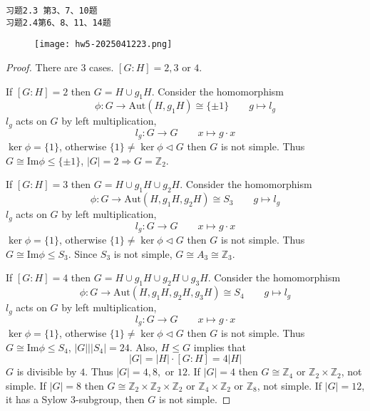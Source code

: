 \begin{lstlisting}
习题2.3 第3、7、10题
习题2.4第6、8、11、14题
\end{lstlisting}
\begin{figure}[H]
\centering
\texttt{[image: hw5-2025041223.png]}
\label{}
\end{figure}

\begin{proof}
There are 3 cases. $[G:H]=2,3$ or $4$.

If $[G:H]=2$ then $G=H\cup g_1H$. Consider the homomorphism
\[
\phi:G\to \mathrm{Aut}(H,g_1H)\cong \{ \pm1 \}\qquad g\mapsto l_{g}
\]
$l_{g}$ acts on $G$ by left multiplication,
\[
l_{g}:G\to G\qquad x\mapsto g\cdot x
\]
$\ker \phi =\{ 1 \}$, otherwise $\{ 1 \}\neq\ker \phi\lhd G$ then $G$ is not simple. Thus $G\cong\mathrm{Im}\phi\leq \{ \pm1 \}$, $\lvert G \rvert=2\Rightarrow G=\mathbb{Z}_{2}$.

If $[G:H]=3$ then $G=H\cup g_1H\cup g_2H$. Consider the homomorphism
\[
\phi:G\to \mathrm{Aut}(H,g_1H,g_2H)\cong S_3\qquad g\mapsto l_{g}
\]
$l_{g}$ acts on $G$ by left multiplication,
\[
l_{g}:G\to G\qquad x\mapsto g\cdot x
\]
$\ker \phi =\{ 1 \}$, otherwise $\{ 1 \}\neq\ker \phi\lhd G$ then $G$ is not simple. Thus $G\cong\mathrm{Im}\phi\leq S_3$. Since $S_3$ is not simple, $G\cong A_3\cong \mathbb{Z}_{3}$.

If $[G:H]=4$ then $G=H\cup g_1H\cup g_2H\cup g_3H$. Consider the homomorphism
\[
\phi:G\to \mathrm{Aut}(H,g_1H,g_2H,g_3H)\cong S_4\qquad g\mapsto l_{g}
\]
$l_{g}$ acts on $G$ by left multiplication,
\[
l_{g}:G\to G\qquad x\mapsto g\cdot x
\]
$\ker \phi =\{ 1 \}$, otherwise $\{ 1 \}\neq\ker \phi\lhd G$ then $G$ is not simple. Thus $G\cong\mathrm{Im}\phi\leq S_4$, $\lvert G \rvert|\lvert S_4 \rvert=24$. Also, $H\leq G$ implies that
\[
\lvert G \rvert =\lvert H \rvert \cdot[G:H]=4\lvert H \rvert
\]
$G$ is divisible by $4$. Thus $\lvert G \rvert=4,8,$ or $12$. If $\lvert G \rvert=4$ then $G\cong \mathbb{Z}_{4}$ or $\mathbb{Z}_{2}\times \mathbb{Z}_{2}$, not simple. If $\lvert G \rvert=8$ then $G\cong \mathbb{Z}_{2}\times\mathbb{Z}_{2}\times \mathbb{Z}_{2}$ or $\mathbb{Z}_{4}\times \mathbb{Z}_{2}$ or $\mathbb{Z}_{8}$, not simple. If $\lvert G \rvert=12$, it has a Sylow 3-subgroup, then $G$ is not simple.
\end{proof}

